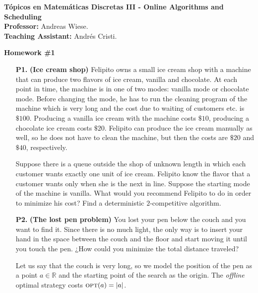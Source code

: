 \documentclass[11pt, spanish]{article}
\theoremstyle{plain}
\newcommand{\R}{\mathds{R}}
\newcommand{\OPT}{\textsc{opt}}
\begin{document}

\begin{flushleft}
  \textbf{Tópicos en Matemáticas Discretas III - Online Algorithms and Scheduling}
  \\\textbf{Professor:} Andreas Wiese.
  \\\textbf{Teaching Assistant:} Andrés Cristi.
\end{flushleft}


\begin{center}
  \Large{\textbf{Homework \#1}}
\end{center}




\begin{itemize}
  \item[\textbf{P1.}] \textbf{(Ice cream shop)}
    Felipito owns a small ice cream shop with a machine that can
    produce two flavors of ice cream, vanilla and chocolate. 
    At each point in time, the machine is in one of two modes: vanilla mode or chocolate mode. 
    Before changing
     the mode, he has to run the cleaning
    program of the machine which is very long and the cost due to waiting of customers etc. is $\$100$.
    Producing a vanilla ice cream with the machine costs
    $\$10$, producing a chocolate ice cream costs $\$20$. Felipito can produce the ice cream
    manually as well, so he does not have to clean
    the machine, but then the costs are $\$20$ and
    $\$40$, respectively.

    Suppose there is a queue outside the shop of unknown length in which each customer wants exactly one unit of ice cream. 
    Felipito know the flavor that a customer wants only when she is the next in line.
    Suppose the starting mode of the machine is vanilla. What would you recommend 
    Felipito to do in order to minimize his cost? Find a deterministic $2$-competitive algorithm.


\item[\textbf{P2.}] \textbf{(The lost pen problem)}
  You lost your pen below the couch and you want to find it. Since
  there is no much light, the only way is to
  insert your hand in the space between the couch and the floor and
  start moving it until you touch the pen. ¿How could you
  minimize the total distance traveled?

  Let us say that the couch is very long, so we model the position
  of the pen as a point $a\in \R$ and the starting point of the search
  as the origin.
  The \emph{offline} optimal strategy costs $\OPT(a)=|a|$.


\end{itemize}
\end{document}
